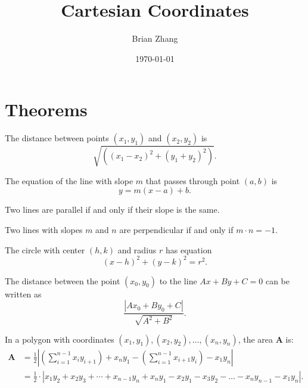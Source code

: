 \documentclass[11pt]{scrartcl}
\title{Cartesian Coordinates}
\author{Brian Zhang}
\date{\today}
\begin{document}
\maketitle

\section{Theorems}

\begin{theorem}
The distance between points $(x_1, y_1)$ and $(x_2, y_2)$ is 
\[\sqrt{((x_1-x_2)^2 + (y_1+y_2)^2)}.\]
\end{theorem}

\begin{theorem}
The equation of the line with slope $m$ that passes through point $(a, b)$ is \[y=m(x-a)+b.\]
\end{theorem}

\begin{theorem}
Two lines are parallel if and only if their slope is the same. 
\end{theorem}

\begin{theorem}
Two lines with slopes $m$ and $n$ are perpendicular if and only if $m\cdot n = -1$. 
\end{theorem}

\begin{theorem}[Circle]
The circle with center $(h, k)$ and radius $r$ has equation
\[(x-h)^2 + (y-k)^2 = r^2.\]
\end{theorem}

\begin{theorem}
The distance between the point $(x_0,y_0)$ to the line $Ax+By+C=0$ can be written as 
\[\frac{|Ax_0+By_0+C|}{\sqrt{A^2+B^2}}.\]
\end{theorem}

\begin{theorem}[Shoelace]
In a polygon with coordinates $(x_1,y_1),(x_2,y_2),\dots,(x_n,y_n)$, the area $\mathbf{A}$ is:
\begin{align*}
    \mathbf{A} &= \frac{1}{2}\left|\left(\sum_{i=1}^{n-1}x_iy_{i+1}\right)+ x_ny_1-\left(\sum_{i=1}^{n-1}x_{i+1}y_i\right)-x_1y_n\right|\\ 
    &=\frac{1}{2}\cdot |x_1y_2+x_2y_3+\cdots + x_{n-1}y_n+x_ny_1-x_2y_1-x_3y_2-\dots-x_ny_{n-1}-x_1y_n|.
\end{align*}
\end{theorem}
\end{document}
